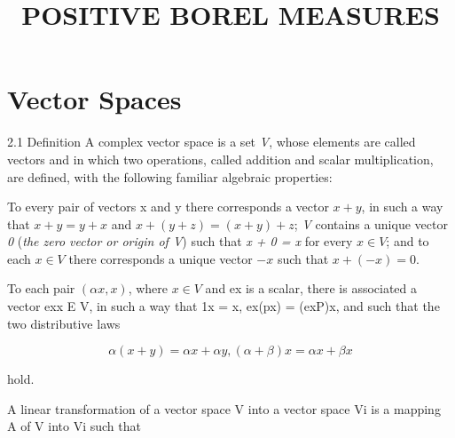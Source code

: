 \documentclass{article}
\title{POSITIVE BOREL MEASURES}
\begin{document}
\maketitle

\section*{Vector Spaces}
\begin{defi}{2.1 Definition}
	A complex vector space  is a set \textit{V}, whose elements are called vectors and in which two operations,
called addition and scalar multiplication, are defined, with the following
familiar algebraic properties:

\vspace{0.2 cm}

To every pair of vectors x and y there corresponds a vector $x + y$, in
such a way that $x + y = y + x$ and $x + (y + z) = (x + y) + z$; \textit{V} contains a
unique vector \textit{0} (\textit{the zero vector or origin of V}) such that \textit{x + 0 = x} for every
$x \in V$; and to each $x \in V$ there corresponds a unique vector $-x$ such that
$x + (-x) = 0$.

\vspace{0.2 cm}

To each pair $(\alpha x, x)$, where $x \in V$ and ex is a scalar, there is associated a vector exx E V, in
such a way that 1x = x, ex(px) = (exP)x, and such that the two distributive laws

\begin{displaymath}
  \alpha(x+y)=\alpha x+\alpha y, (\alpha+\beta)x=\alpha x+\beta x
\end{displaymath}

hold.

\vspace{0.2 cm}

A linear transformation of a vector space V into a vector space Vi is a mapping A of V into Vi such that


\end{defi}
\end{document}
